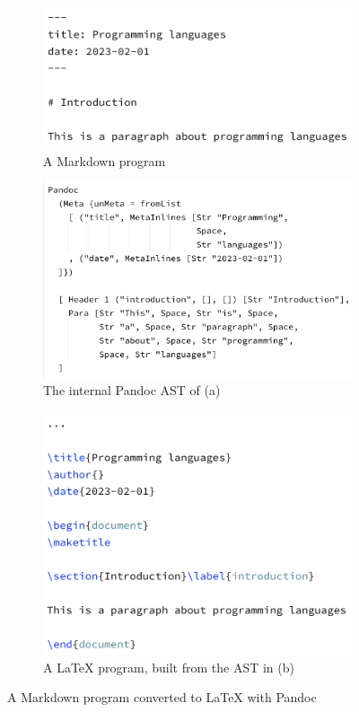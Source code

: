 \begin{figure}[ht]
\centering
\begin{subfigure}{.6\textwidth}
  \centering
  \includegraphics[width=1\linewidth]{assets/pandocMD.png}
  \caption{A Markdown program}
  \label{fig:a}
\end{subfigure}
\begin{subfigure}{.6\textwidth}
  \centering
  \includegraphics[width=1\linewidth]{assets/pandocHASKELL.png}
  \caption{The internal Pandoc AST of (a)}
  \label{fig:b}
\end{subfigure}
\begin{subfigure}{.6\textwidth}
  \centering
  \includegraphics[width=1\linewidth]{assets/pandocLATEX.png}
  \caption{A LaTeX program, built from the AST in (b)}
  \label{fig:c}
\end{subfigure}

\caption{A Markdown program converted to LaTeX with Pandoc}
\label{fig:d}
\end{figure}
